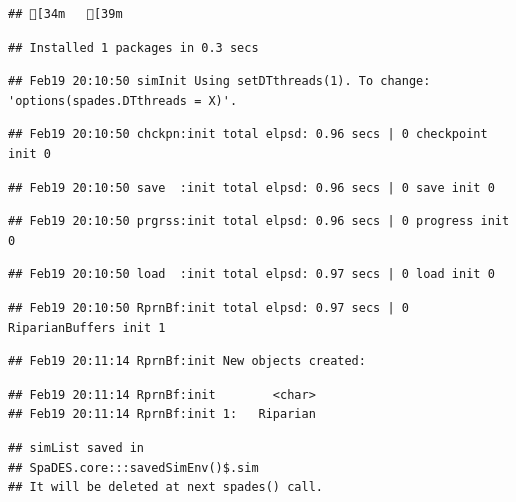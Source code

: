 \documentclass[
]{article}
\newenvironment{Shaded}{\begin{snugshade}}{\end{snugshade}}
\newcommand{\NormalTok}[1]{#1}
\newcommand{\OtherTok}[1]{\textcolor[rgb]{0.56,0.35,0.01}{#1}}
\newcommand{\SpecialCharTok}[1]{\textcolor[rgb]{0.81,0.36,0.00}{\textbf{#1}}}
\begin{document}
\begin{verbatim}
## [34m   [39m
\end{verbatim}

\begin{verbatim}
## Installed 1 packages in 0.3 secs
\end{verbatim}

\begin{verbatim}
## Feb19 20:10:50 simInit Using setDTthreads(1). To change: 'options(spades.DTthreads = X)'.
\end{verbatim}

\begin{verbatim}
## Feb19 20:10:50 chckpn:init total elpsd: 0.96 secs | 0 checkpoint init 0
\end{verbatim}

\begin{verbatim}
## Feb19 20:10:50 save  :init total elpsd: 0.96 secs | 0 save init 0
\end{verbatim}

\begin{verbatim}
## Feb19 20:10:50 prgrss:init total elpsd: 0.96 secs | 0 progress init 0
\end{verbatim}

\begin{verbatim}
## Feb19 20:10:50 load  :init total elpsd: 0.97 secs | 0 load init 0
\end{verbatim}

\begin{verbatim}
## Feb19 20:10:50 RprnBf:init total elpsd: 0.97 secs | 0 RiparianBuffers init 1
\end{verbatim}

\begin{verbatim}
## Feb19 20:11:14 RprnBf:init New objects created:
\end{verbatim}

\begin{verbatim}
## Feb19 20:11:14 RprnBf:init        <char>
## Feb19 20:11:14 RprnBf:init 1:   Riparian
\end{verbatim}

\begin{verbatim}
## simList saved in
## SpaDES.core:::savedSimEnv()$.sim
## It will be deleted at next spades() call.
\end{verbatim}

\begin{Shaded}
\end{Shaded}
\end{document}

